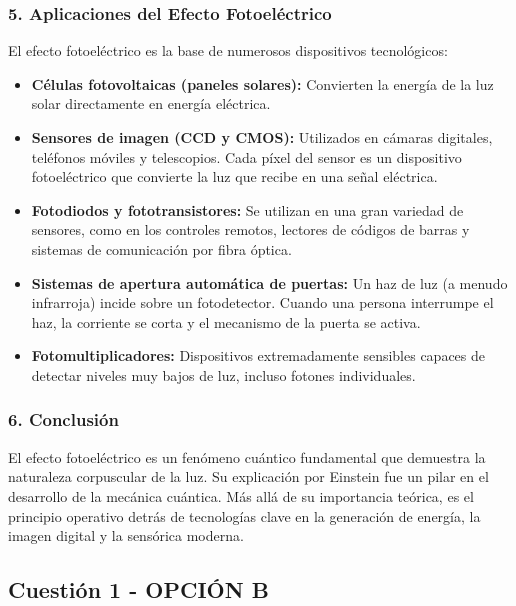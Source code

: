 \subsubsection*{5. Aplicaciones del Efecto Fotoeléctrico}
El efecto fotoeléctrico es la base de numerosos dispositivos tecnológicos:
\begin{itemize}
    \item \textbf{Células fotovoltaicas (paneles solares):} Convierten la energía de la luz solar directamente en energía eléctrica.
    \item \textbf{Sensores de imagen (CCD y CMOS):} Utilizados en cámaras digitales, teléfonos móviles y telescopios. Cada píxel del sensor es un dispositivo fotoeléctrico que convierte la luz que recibe en una señal eléctrica.
    \item \textbf{Fotodiodos y fototransistores:} Se utilizan en una gran variedad de sensores, como en los controles remotos, lectores de códigos de barras y sistemas de comunicación por fibra óptica.
    \item \textbf{Sistemas de apertura automática de puertas:} Un haz de luz (a menudo infrarroja) incide sobre un fotodetector. Cuando una persona interrumpe el haz, la corriente se corta y el mecanismo de la puerta se activa.
    \item \textbf{Fotomultiplicadores:} Dispositivos extremadamente sensibles capaces de detectar niveles muy bajos de luz, incluso fotones individuales.
\end{itemize}

\subsubsection*{6. Conclusión}
\begin{cajaconclusion}
El efecto fotoeléctrico es un fenómeno cuántico fundamental que demuestra la naturaleza corpuscular de la luz. Su explicación por Einstein fue un pilar en el desarrollo de la mecánica cuántica. Más allá de su importancia teórica, es el principio operativo detrás de tecnologías clave en la generación de energía, la imagen digital y la sensórica moderna.
\end{cajaconclusion}

\newpage

\subsection{Cuestión 1 - OPCIÓN B}
\label{subsec:6B_2000_jun_ord}

